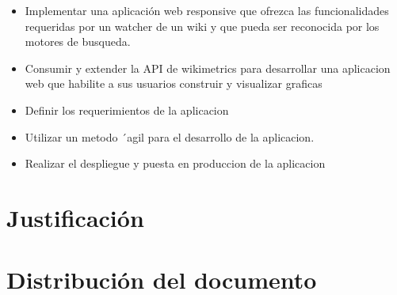 \begin{itemize}{}{}

    \item Implementar una aplicación web responsive que ofrezca las funcionalidades requeridas por un watcher de un wiki y que pueda ser reconocida por los motores de busqueda.

    \item Consumir y extender la API de wikimetrics para desarrollar una aplicacion web que habilite a sus usuarios construir y visualizar graficas
    
    \item Definir los requerimientos de la aplicacion
    \item Utilizar un metodo ´agil para el desarrollo de la aplicacion.
    \item Realizar el despliegue y puesta en produccion de la aplicacion
    
\end{itemize}


\section{Justificación}

\section{Distribución del documento}

